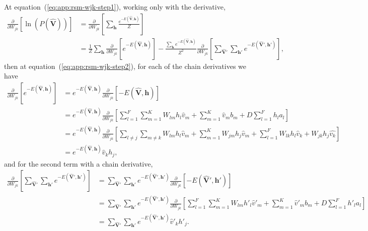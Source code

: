 At equation~(\ref{eq:app:rsm-wjk-step1}), working only with the derivative,
\begin{align}
    \frac{\partial}{\partial W_{jk}} \left[ \ln\left(P(\mathbf{\hat{V}})\right) \right] &= \frac{\partial}{\partial W_{jk}} \left[ \sum_{\mathbf{h}} \frac{e^{-E(\mathbf{\hat{V}}, \mathbf{h})}}{Z} \right] \nonumber \\ %
    \label{eq:app:rsm-wjk-step2}
    &= \frac{1}{Z} \sum_{\mathbf{h}} \frac{\partial}{\partial W_{jk}} \left[ e^{-E(\mathbf{\hat{V}}, \mathbf{h})} \right] - \frac{\sum_{\mathbf{h}} e^{-E(\mathbf{\hat{V}}, \mathbf{h})}}{Z^{2}} \frac{\partial}{\partial W_{jk}} \left[ \sum_{\mathbf{\hat{V}}'} \sum_{\mathbf{h}'} e^{-E(\mathbf{\hat{V}}', \mathbf{h}')} \right],
\end{align}
then at equation~(\ref{eq:app:rsm-wjk-step2}), for each of the chain derivatives we have
\begin{align}
    \frac{\partial}{\partial W_{jk}} \left[ e^{-E(\mathbf{\hat{V}}, \mathbf{h})} \right] &= e^{-E(\mathbf{\hat{V}}, \mathbf{h})} \frac{\partial}{\partial W_{jk}} \left[ -E(\mathbf{\hat{V}}, \mathbf{h}) \right] \nonumber \\ %
    &= e^{-E(\mathbf{\hat{V}}, \mathbf{h})} \frac{\partial}{\partial W_{jk}} \left[ \sum^{F}_{l=1} \sum^{K}_{m=1} W_{lm} h_{l} \hat{v}_{m} + \sum^{K}_{m=1} \hat{v}_{m} b_{m} + D \sum^{F}_{l=1} h_{l} a_{l} \right] \nonumber \\ %
    &= e^{-E(\mathbf{\hat{V}}, \mathbf{h})} \frac{\partial}{\partial W_{jk}} \left[ \sum_{l\neq j} \sum_{m \neq k} W_{lm} h_{l} \hat{v}_{m} + \sum^{K}_{m=1} W_{jm} h_{j} \hat{v}_{m} + \sum^{F}_{l=1} W_{lk} h_{l} \hat{v}_{k} + W_{jk} h_{j} \hat{v_{k}} \right] \nonumber \\ %
    \label{eq:app:rsm-wjk-step3}
    &= e^{-E(\mathbf{\hat{V}}, \mathbf{h})} \hat{v}_{k} h_{j}, 
\end{align}
and for the second term with a chain derivative,
\begin{align}
    \frac{\partial}{\partial W_{jk}} \left[ \sum_{\mathbf{\hat{V}}'} \sum_{\mathbf{h}'} e^{-E(\mathbf{\hat{V}}', \mathbf{h}')} \right] &= \sum_{\mathbf{\hat{V}}'} \sum_{\mathbf{h}'} e^{-E(\mathbf{\hat{V}}', \mathbf{h}')} \frac{\partial}{\partial W_{jk}} \left[ -E(\mathbf{\hat{V}}', \mathbf{h}') \right] \nonumber \\ %
    &= \sum_{\mathbf{\hat{V}}'} \sum_{\mathbf{h}'} e^{-E(\mathbf{\hat{V}}', \mathbf{h}')} \frac{\partial}{\partial W_{jk}} \left[ \sum^{F}_{l=1} \sum^{K}_{m=1} W_{lm} h'_{l} \hat{v}'_{m} + \sum^{K}_{m=1} \hat{v}'_{m} b_{m} + D \sum^{F}_{l=1} h'_{l} a_{l} \right] \nonumber \\ %
    \label{eq:app:rsm-wjk-step4}
    &= \sum_{\mathbf{\hat{V}}'} \sum_{\mathbf{h}'} e^{-E(\mathbf{\hat{V}}', \mathbf{h}')} \hat{v}'_{k} h'_{j}. 
\end{align}

